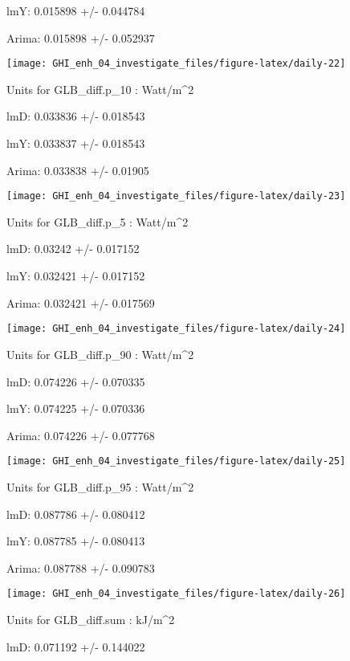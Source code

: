 \documentclass[
  10pt,
  a4paper,oneside]{article}
\begin{document}
lmY: 0.015898 +/- 0.044784

Arima: 0.015898 +/- 0.052937

\begin{center}\texttt{[image: GHI\_enh\_04\_investigate\_files/figure-latex/daily-22]} \end{center}

Units for GLB\_diff.p\_10 : Watt/m\^{}2

lmD: 0.033836 +/- 0.018543

lmY: 0.033837 +/- 0.018543

Arima: 0.033838 +/- 0.01905

\begin{center}\texttt{[image: GHI\_enh\_04\_investigate\_files/figure-latex/daily-23]} \end{center}

Units for GLB\_diff.p\_5 : Watt/m\^{}2

lmD: 0.03242 +/- 0.017152

lmY: 0.032421 +/- 0.017152

Arima: 0.032421 +/- 0.017569

\begin{center}\texttt{[image: GHI\_enh\_04\_investigate\_files/figure-latex/daily-24]} \end{center}

Units for GLB\_diff.p\_90 : Watt/m\^{}2

lmD: 0.074226 +/- 0.070335

lmY: 0.074225 +/- 0.070336

Arima: 0.074226 +/- 0.077768

\begin{center}\texttt{[image: GHI\_enh\_04\_investigate\_files/figure-latex/daily-25]} \end{center}

Units for GLB\_diff.p\_95 : Watt/m\^{}2

lmD: 0.087786 +/- 0.080412

lmY: 0.087785 +/- 0.080413

Arima: 0.087788 +/- 0.090783

\begin{center}\texttt{[image: GHI\_enh\_04\_investigate\_files/figure-latex/daily-26]} \end{center}

Units for GLB\_diff.sum : kJ/m\^{}2

lmD: 0.071192 +/- 0.144022
\end{document}
